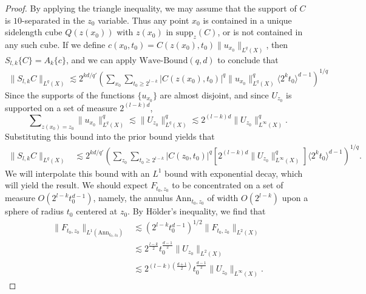 \begin{proof}
    By applying the triangle inequality, we may assume that the support of $C$ is $10$-separated in the $z_0$ variable. Thus any point $x_0$ is contained in a unique sidelength cube $Q(z(x_0))$ with $z(x_0)$ in $\text{supp}_z(C)$, or is not contained in any such cube. If we define $c(x_0,t_0) = C(z(x_0),t_0) \| u_{x_0} \|_{L^q(X)}$, then $S_{l,k} \{ C \} = A_k \{ c \}$, and we can apply $\text{Wave-Bound}(q,d)$ to conclude that
    \begin{align*}
      \| S_{l,k} C \|_{L^q(X)} \lesssim 2^{kd/q'} \left( \sum\nolimits_{x_0} \sum\nolimits_{t_0 \geq 2^{l-k}} |C(z(x_0),t_0)|^q \| u_{x_0} \|_{L^q(X)}^q \langle 2^k t_0 \rangle^{d-1} \right)^{1/q}
    \end{align*}
    Since the supports of the functions $\{ u_{x_0} \}$ are almost disjoint, and since $U_{z_0}$ is supported on a set of measure $2^{(l-k)d}$,
    \[ \sum\nolimits_{z(x_0) = z_0} \| u_{x_0} \|_{L^q(X)}^q \lesssim \| U_{z_0} \|_{L^q(X)}^q \lesssim 2^{(l-k)d} \| U_{z_0} \|_{L^\infty(X)}^q. \]
    Substituting this bound into the prior bound yields that
    \begin{align*}
        \| S_{l,k} C \|_{L^q(X)} &\lesssim 2^{kd/q'} \left( \sum\nolimits_{z_0} \sum\nolimits_{t_0 \geq 2^{l-k}} |C(z_0,t_0)|^q \left[ 2^{(l-k)d} \| U_{z_0} \|_{L^\infty(X)}^q \right] \langle 2^k t_0 \rangle^{d-1} \right)^{1/q}.
    \end{align*}
    We will interpolate this bound with an $L^1$ bound with exponential decay, which will yield the result. We should expect $F_{t_0,z_0}$ to be concentrated on a set of measure $O( 2^{l-k} t_0^{d-1} )$, namely, the annulus $\text{Ann}_{t_0,z_0}$ of width $O(2^{l-k})$ upon a sphere of radius $t_0$ centered at $z_0$. By H\"{o}lder's inequality, we find that
    \begin{align*}
        \| F_{t_0,z_0} \|_{L^1(\text{Ann}_{t_0,z_0})} &\lesssim \left( 2^{l-k} t_0^{d-1} \right)^{1/2} \| F_{t_0,z_0} \|_{L^2(X)}\\
        &\lesssim 2^{\frac{l-k}{2}} t_0^{\frac{d-1}{2}} \| U_{z_0} \|_{L^2(X)}\\
        &\lesssim 2^{(l-k) \left( \frac{d+1}{2}\right)} t_0^{\frac{d-1}{2}} \| U_{z_0} \|_{L^\infty(X)}.

\end{align*}
\end{proof}
